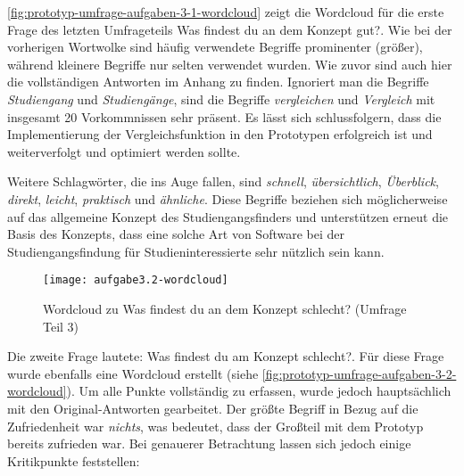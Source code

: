 \autoref{fig:prototyp-umfrage-aufgaben-3-1-wordcloud} zeigt die Wordcloud für die erste Frage des letzten Umfrageteils \glqq Was findest du an dem Konzept gut?\grqq{}. Wie bei der vorherigen Wortwolke sind häufig verwendete Begriffe prominenter (größer), während kleinere Begriffe nur selten verwendet wurden. Wie zuvor sind auch hier die vollständigen Antworten im Anhang zu finden. Ignoriert man die Begriffe \textit{Studiengang} und \textit{Studiengänge}, sind die Begriffe \textit{vergleichen} und \textit{Vergleich} mit insgesamt 20 Vorkommnissen sehr präsent. Es lässt sich schlussfolgern, dass die Implementierung der Vergleichsfunktion in den Prototypen erfolgreich ist und weiterverfolgt und optimiert werden sollte.

Weitere Schlagwörter, die ins Auge fallen, sind \textit{schnell}, \textit{übersichtlich}, \textit{Überblick}, \textit{direkt}, \textit{leicht}, \textit{praktisch} und \textit{ähnliche}. Diese Begriffe beziehen sich möglicherweise auf das allgemeine Konzept des Studiengangsfinders und unterstützen erneut die Basis des Konzepts, dass eine solche Art von Software bei der Studiengangsfindung für Studieninteressierte sehr nützlich sein kann.


\begin{figure}[H]
    \centering
    \texttt{[image: aufgabe3.2-wordcloud]}
    \caption{Wordcloud zu \glqq Was findest du an dem Konzept schlecht?\grqq{} (Umfrage Teil 3)}
    \label{fig:prototyp-umfrage-aufgaben-3-2-wordcloud}
\end{figure}

Die zweite Frage lautete: \glqq Was findest du am Konzept schlecht?\grqq{}. Für diese Frage wurde ebenfalls eine Wordcloud erstellt (siehe \autoref{fig:prototyp-umfrage-aufgaben-3-2-wordcloud}). Um alle Punkte vollständig zu erfassen, wurde jedoch hauptsächlich mit den Original-Antworten gearbeitet. Der größte Begriff in Bezug auf die Zufriedenheit war \textit{nichts}, was bedeutet, dass der Großteil mit dem Prototyp bereits zufrieden war. Bei genauerer Betrachtung lassen sich jedoch einige Kritikpunkte feststellen:

